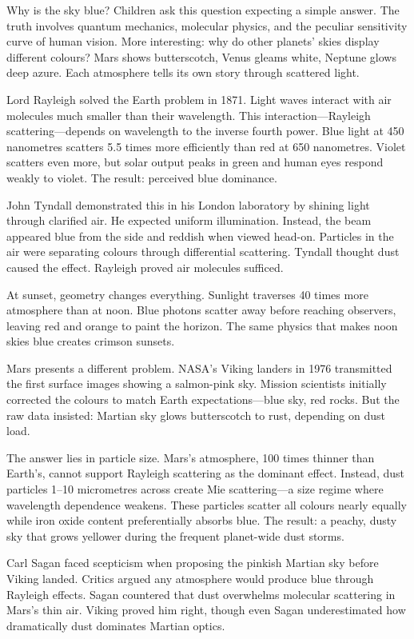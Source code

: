 Why is the sky blue? Children ask this question expecting a simple answer. The truth involves quantum mechanics, molecular physics, and the peculiar sensitivity curve of human vision. More interesting: why do other planets' skies display different colours? Mars shows butterscotch, Venus gleams white, Neptune glows deep azure. Each atmosphere tells its own story through scattered light.

Lord Rayleigh solved the Earth problem in 1871. Light waves interact with air molecules much smaller than their wavelength. This interaction—Rayleigh scattering—depends on wavelength to the inverse fourth power. Blue light at 450 nanometres scatters 5.5 times more efficiently than red at 650 nanometres. Violet scatters even more, but solar output peaks in green and human eyes respond weakly to violet. The result: perceived blue dominance.

John Tyndall demonstrated this in his London laboratory by shining light through clarified air. He expected uniform illumination. Instead, the beam appeared blue from the side and reddish when viewed head-on. Particles in the air were separating colours through differential scattering. Tyndall thought dust caused the effect. Rayleigh proved air molecules sufficed.

At sunset, geometry changes everything. Sunlight traverses 40 times more atmosphere than at noon. Blue photons scatter away before reaching observers, leaving red and orange to paint the horizon. The same physics that makes noon skies blue creates crimson sunsets.

Mars presents a different problem. NASA's Viking landers in 1976 transmitted the first surface images showing a salmon-pink sky. Mission scientists initially \QSOpen{}corrected\QSClose{} the colours to match Earth expectations—blue sky, red rocks. But the raw data insisted: Martian sky glows butterscotch to rust, depending on dust load.

The answer lies in particle size. Mars's atmosphere, 100 times thinner than Earth's, cannot support Rayleigh scattering as the dominant effect. Instead, dust particles 1–10 micrometres across create Mie scattering—a size regime where wavelength dependence weakens. These particles scatter all colours nearly equally while iron oxide content preferentially absorbs blue. The result: a peachy, dusty sky that grows yellower during the frequent planet-wide dust storms.

Carl Sagan faced scepticism when proposing the pinkish Martian sky before Viking landed. Critics argued any atmosphere would produce blue through Rayleigh effects. Sagan countered that dust overwhelms molecular scattering in Mars's thin air. Viking proved him right, though even Sagan underestimated how dramatically dust dominates Martian optics.

